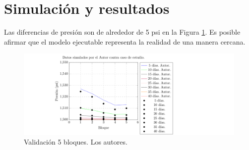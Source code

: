 \section{Simulación y resultados} \label{sec:results}
Las diferencias de presión son de alrededor de 5 psi en la Figura \ref{fig:validaciont}. Es posible afirmar que el modelo ejecutable representa la realidad de una manera cercana.
\begin{figure}[h]
	\centering%
	\includegraphics[width=\linewidth]{Fig/validacion.pdf}%
	\caption[Validación 5 bloques.]{Validación 5 bloques. Los autores.} \label{fig:validaciont}
\end{figure}